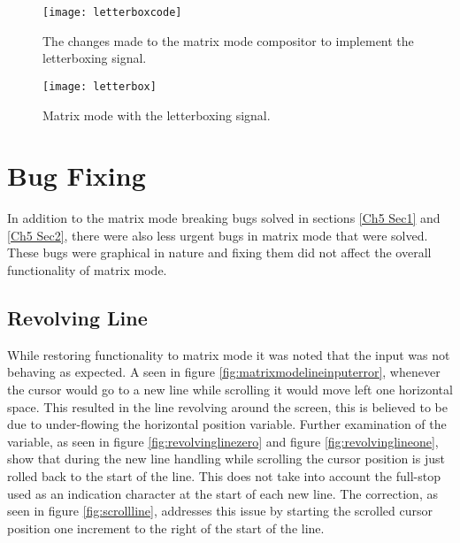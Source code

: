 \begin{figure}
  \centering
  \texttt{[image: letterboxcode]}
  \caption{The changes made to the matrix mode compositor to implement the letterboxing signal.}
  \label{fig:letterboxcode}
\end{figure}

\begin{figure}
  \centering
  \texttt{[image: letterbox]}
  \caption{Matrix mode with the letterboxing signal.}
  \label{fig:letterbox}
\end{figure}


\section{Bug Fixing}

\label{Ch5 Sec3}

In addition to the matrix mode breaking bugs solved in sections \ref{Ch5 Sec1} and \ref{Ch5 Sec2}, there were also less urgent bugs in matrix mode that were solved. These bugs were graphical in nature and fixing them did not affect the overall functionality of matrix mode.


\subsection{Revolving Line}

\label{Ch5 Sec3 Sub1}

While restoring functionality to matrix mode it was noted that the input was not behaving as expected. A seen in figure \ref{fig:matrixmodelineinputerror}, whenever the cursor would go to a new line while scrolling it would move left one horizontal space. This resulted in the line revolving around the screen, this is believed to be due to under-flowing the horizontal position variable. Further examination of the variable, as seen in figure \ref{fig:revolvinglinezero} and figure \ref{fig:revolvinglineone}, show that during the new line handling while scrolling the cursor position is just rolled back to the start of the line. This does not take into account the full-stop used as an indication character at the start of each new line. The correction, as seen in figure \ref{fig:scrollline}, addresses this issue by starting the scrolled cursor position one increment to the right of the start of the line.

